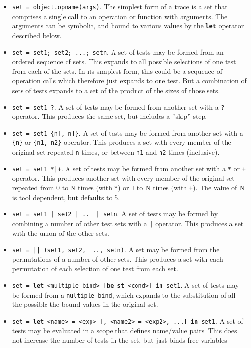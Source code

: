 \documentclass{overturerepchap}
\begin{document}
\begin{itemize}
\item \texttt{set = object.opname(args)}. The simplest form of a trace is a set
that comprises a single call to an operation or function with arguments. The
arguments can be symbolic, and bound to various values by the \texttt{\textbf{let}}
operator described below.
\item \texttt{set = set1; set2; ...; setn}. A set of tests may be formed from
an ordered sequence of sets. This expands to all possible selections of one test
from each of the sets. In its simplest form, this could be a sequence of
operation calls which therefore just expands to one test. But a combination of
sets of tests expands to a set of the product of the sizes of those sets.
\item \texttt{set = set1 ?}. A set of tests may be formed from another set with
a \texttt{?} operator. This produces the same set, but includes a ``skip'' step.
\item \texttt{set = set1 \{n[, n]\}}. A set of tests may be formed from another
set with a \texttt{\{n\}} or \texttt{\{n1, n2\}} operator. This produces a set
with every member of the original set repeated \texttt{n} times, or between
\texttt{n1} and \texttt{n2} times (inclusive).
\item \texttt{set = set1 *|+}. A set of tests may be formed from another set
with a \texttt{*} or \texttt{+} operator. This produces another set with every member
of the original set repeated from 0 to N times (with \texttt{*}) or 1 to N times
(with \texttt{+}). The value of N is tool dependent, but defaults to 5.
\item \texttt{set = set1 | set2 | ... | setn}. A set of tests may be formed by
combining a number of other test sets with a \texttt{|} operator. This produces
a set with the union of the other sets.
\item \texttt{set = || (set1, set2, ..., setn)}. A set may be formed from the
permutations of a number of other sets. This produces a set with each
permutation of each selection of one test from each set.
\item \texttt{set = \textbf{let} <multiple bind> [\textbf{be st} <cond>]
\textbf{in} set1}. A set of tests may be formed from a \texttt{multiple bind},
which expands to the substitution of all the possible the bound values in the
original set.
\item \texttt{set = \textbf{let} <name> = <exp> [, <name2> = <exp2>,
...]\ \textbf{in} set1}.
A set of tests may be evaluated in a scope that defines name/value pairs. This does
not increase the number of tests in the set, but just binds free variables.
\end{itemize}
\end{document}
